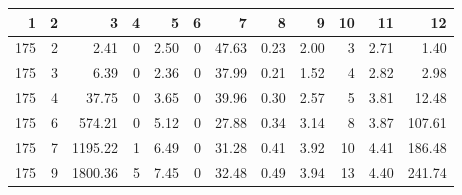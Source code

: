 \begin{tabular}{rrrrrrrrrrrr}
\toprule
1 & 2 & 3 & 4 & 5 & 6 & 7 & 8 & 9 & 10 & 11 & 12 \\
\midrule
175 & 2 & 2.41 & 0 & 2.50 & 0 & 47.63 & 0.23 & 2.00 & 3 & 2.71 & 1.40 \\
175 & 3 & 6.39 & 0 & 2.36 & 0 & 37.99 & 0.21 & 1.52 & 4 & 2.82 & 2.98 \\
175 & 4 & 37.75 & 0 & 3.65 & 0 & 39.96 & 0.30 & 2.57 & 5 & 3.81 & 12.48 \\
175 & 6 & 574.21 & 0 & 5.12 & 0 & 27.88 & 0.34 & 3.14 & 8 & 3.87 & 107.61 \\
175 & 7 & 1195.22 & 1 & 6.49 & 0 & 31.28 & 0.41 & 3.92 & 10 & 4.41 & 186.48 \\
175 & 9 & 1800.36 & 5 & 7.45 & 0 & 32.48 & 0.49 & 3.94 & 13 & 4.40 & 241.74 \\
\bottomrule
\end{tabular}

